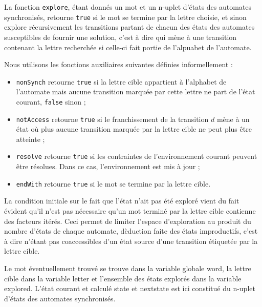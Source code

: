 La fonction \texttt{explore}, \'etant donn\'es un mot et un n-uplet
d'\'etats des automates synchronis\'es, retourne 
\texttt{true} si le mot se termine par la lettre choisie, et sinon
explore r\'ecursivement les transitions partant de chacun des
\'etats des automates susceptibles de fournir une solution, c'est
\`a dire qui m\`ene \`a une transition contenant la lettre
recherch\'ee si celle-ci fait portie de l'alpuabet de l'automate.

Nous utilisons les fonctions auxiliaires suivantes d\'efinies
informellement :
\begin{itemize}
  \item \texttt{nonSynch} retourne \texttt{true} si la lettre cible
    appartient \`a l'alphabet de l'automate mais aucune transition
    marqu\'ee par cette lettre ne part de l'\'etat courant, \texttt{false} sinon ;
  \item \texttt{notAccess} retourne \texttt{true} si le franchissement
    de la transition $d$ m\`ene \`a un \'etat o\`u plus aucune
    transition marqu\'ee par la lettre cible ne peut plus \^etre
    atteinte ;
  \item \texttt{resolve} retourne  \texttt{true} si les contraintes de
   l'environnement courant peuvent \^etre r\'esolues. Dans ce cas,
   l'environnement est mis \`a jour ;
 \item \texttt{endWith} retourne \texttt{true} si le mot se termine par
   la lettre cible.
\end{itemize}

La condition initiale sur le fait que l'\'etat n'ait pas \'et\'e
explor\'e vient du fait \'evident qu'il n'est pas n\'ecessaire
qu'un mot termin\'e par la lettre cible contienne des facteurs
it\'er\'es. Ceci permet de limiter l'espace d'exploration au produit
du nombre d'\'etats de chaque automate, d\`eduction faite des
\'etats improductifs, c'est \`a dire n'\'etant pas coaccessibles
d'un \'etat source d'une transition \'etiquet\'ee par la lettre cible.

Le mot \'eventuellement trouv\'e se trouve dans la variable globale
\textsf{word}, la lettre cible dans la variable \textsf{letter} et
l'ensemble des \'etats explor\'es dans la variable
\textsf{explored}. L'\'etat courant et calcul\'e \textsf{state} et \textsf{nextstate} est ici constitu\'e du n-uplet
d'\'etats des automates synchronis\'es.

